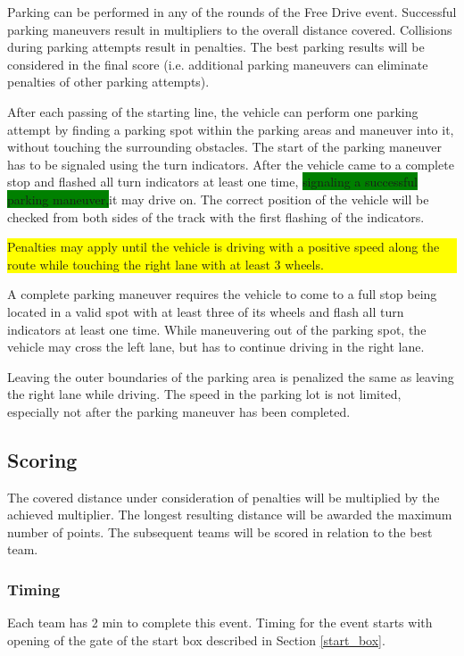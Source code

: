 \documentclass[a4paper]{report}
\newlength\colorboxwidth
\begin{document}
Parking can be performed in any of the rounds of the Free Drive event.
Successful parking maneuvers result in multipliers to the overall distance
covered. Collisions during parking attempts result in penalties. The best
parking results will be considered in the final score (i.e. additional parking
maneuvers can eliminate penalties of other parking attempts).

After each passing of the starting line, the vehicle can perform one parking
attempt by finding a parking spot within the parking areas and maneuver into
it, without touching the surrounding obstacles. The start of the parking
maneuver has to be signaled using the turn indicators. After the vehicle came
to a complete stop and flashed all turn indicators at least one time,
\colorbox{green}{signaling a successful parking maneuver,}it may drive on. The
correct position of the vehicle will be checked from both sides of the track
with the first flashing of the indicators.
	{\colorbox{yellow}{\parbox{\colorboxwidth}{Penalties may apply until the
				vehicle is driving with a positive speed along the route while touching the
				right lane with at least 3 wheels.}}}

A complete parking maneuver requires the vehicle to come to a full stop being
located in a valid spot with at least three of its wheels and flash all turn
indicators at least one time. While maneuvering out of the parking spot, the
vehicle may cross the left lane, but has to continue driving in the right lane.

Leaving the outer boundaries of the parking area is penalized the same as
leaving the right lane while driving. The speed in the parking lot is not
limited, especially not after the parking maneuver has been completed.

\subsection{Scoring}
\label{freedrive_scoring}

The covered distance under consideration of penalties will be multiplied by the
achieved multiplier. The longest resulting distance will be awarded the maximum
number of points. The subsequent teams will be scored in relation to the best
team.

\subsubsection{Timing}

Each team has 2 min to complete this event. Timing for the event starts with
opening of the gate of the start box described in Section \ref{start_box}.
\end{document}
